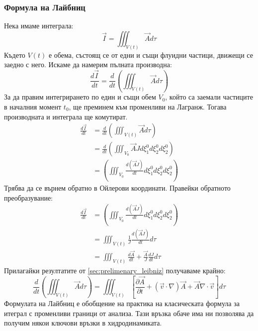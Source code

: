 \subsubsection{Формула на Лайбниц}
Нека имаме интеграла:
\begin{equation*}
	\vec{I} = \iiint_{V(t)} \vec{A} d \tau
\end{equation*}
Където $V(t)$ е обема, състоящ се от едни и същи флуидни частици, движещи се заедно с него. Искаме да намерим пълната производна:
\begin{equation*}
	\frac{d \vec{I}}{d t} = \frac{d}{d t}\left(\iiint_{V(t)} \vec{A} d \tau\right)
\end{equation*}
За да правим интегрирането по един и същи обем $V_0$, който са заемали частиците в началния момент $t_0$, ще преминем към променливи на Лагранж.
Тогава производната и интеграла ще комутират.
\begin{align*}
	\frac{d \vec{I}}{d t} & = \frac{d}{d t}\left(\iiint_{V(t)} \vec{A} d \tau\right)                             \\
	                      & = \frac{d}{d t}\left(\iiint_{V_0} \vec{A} J d \xi^0_1 d \xi^0_2 d \xi^0_2 \right)    \\
	                      & = \left(\iiint_{V_0} \frac{d(\vec{A} J) }{d t} d \xi^0_1 d \xi^0_2 d \xi^0_2 \right)
\end{align*}
Трябва да се върнем обратно в Ойлерови координати. Правейки обратното преобразувание:
\begin{align*}
	\frac{d \vec{I}}{d t} & = \left(\iiint_{V_0} \frac{d(\vec{A} J) }{d t} d \xi^0_1 d \xi^0_2 d \xi^0_2 \right) \\
	                      & = \iiint_{V(t)} \frac{1}{J}\frac{d(\vec{A} J) }{d t} d \tau                          \\
	                      & = \iiint_{V(t)} \frac{d \vec{A}}{d t} + \frac{\vec{A}}{J} \frac{d J}{d t} d \tau
\end{align*}
Прилагайки резултатите от \autoref{sec:prelimenary_leibniz} получаваме крайно:
\begin{equation}
	\label{eq:leibniz}
	\frac{d}{d t}\left(\iiint_{V(t)} \vec{A} d \tau\right) = \iiint_{V(t)} \left[
		\frac{\partial \vec{A}}{\partial t} + (\vec{v} \cdot \nabla) \vec{A} + \vec{A} \nabla \cdot \vec{v}
		\right] d\tau
\end{equation}
Формулата на Лайбниц е обобщение на практика на класическата формула за итеграл с променливи граници от анализа. Тази връзка обаче има ни позволява да получим някои ключови връзки в хидродинамиката.

